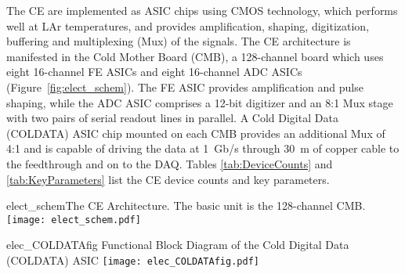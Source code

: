 The CE are implemented as ASIC chips using CMOS technology,
which performs well at LAr temperatures,
and provides amplification, shaping, digitization, buffering and multiplexing (Mux) of the signals.
The CE architecture is manifested in the Cold Mother Board (CMB),
a 128-channel board which uses eight 16-channel FE ASICs and eight 16-channel ADC ASICs
(Figure~\ref{fig:elect_schem}).
The FE ASIC provides amplification and pulse shaping, while
the ADC ASIC comprises a 12-bit digitizer
and an 8:1 Mux stage with two pairs of serial readout lines in parallel.
A Cold Digital Data (COLDATA) ASIC chip mounted on each CMB provides an additional Mux of 4:1 and
is capable of driving the data at 1~Gb/s through 30~m of copper cable to the feedthrough and on to the DAQ. 
Tables \ref{tab:DeviceCounts} and \ref{tab:KeyParameters} list the CE device counts and key parameters.
\vskip -10pt %
\begin{cdrfigure}{elect_schem}{The CE Architecture. The basic unit is the 128-channel CMB.}
\texttt{[image: elect\_schem.pdf]}
\end{cdrfigure}
\begin{cdrfigure}{elec_COLDATAfig}
{Functional Block Diagram of the Cold Digital Data (COLDATA) ASIC}
\texttt{[image: elec\_COLDATAfig.pdf]}
\end{cdrfigure}

